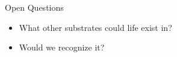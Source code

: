 \documentclass[]{article}
\begin{document}
Open Questions

\begin{itemize}
	\item What other substrates could life exist in?
	\item Would we recognize it?
\end{itemize}



\printglossaries

 


\end{document}
